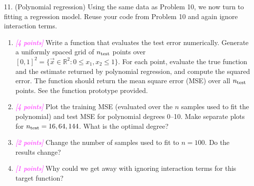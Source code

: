 \documentclass{article}
\newcommand{\R}{\mathbb{R}} %
\newcommand{\points}[1]{\small\textcolor{magenta}{\emph{[#1 points]}} \normalsize}
\begin{document}
11. (Polynomial regression)
Using the same data as Problem 10, we now turn to fitting a regression model.
Reuse your code from Problem 10 and again ignore interaction terms.
\begin{enumerate}
\item \points{4} Write a function that evaluates the test error numerically.
  Generate a uniformly spaced grid of $n_{\rm test}$ points over 
  $[0,1]^2 = \{\vec x \in \R^2: 0 \leq x_1, x_2 \leq 1\}$.
  For each point, evaluate the true function and the estimate returned by polynomial regression,
  and compute the squared error.
  The function should return the mean square error (MSE) over all $n_{\rm test}$ points.
  See the function prototype provided.
\item \points{4}
  Plot the training MSE (evaluated over the $n$ samples used to fit the polynomial)
  and test MSE for polynomial degrees 0--10.
  Make separate plots for $n_{\rm test} = 16, 64, 144$.
  What is the optimal degree?
\item \points{2}
  Change the number of samples used to fit to $n = 100$. Do the results change?
\item \points{1}
  Why could we get away with ignoring interaction terms for this target function?
\end{enumerate}
\end{document}
